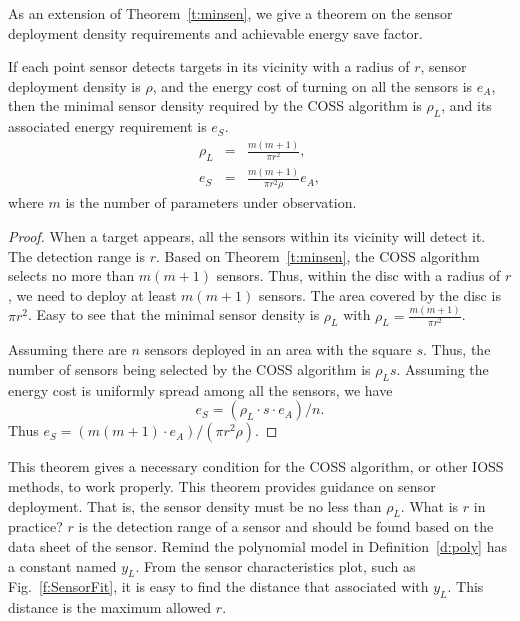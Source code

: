 As an extension of Theorem~\ref{t:minsen}, we give a theorem on the sensor deployment density requirements and achievable energy save factor.
\begin{thm} %
If each point sensor detects targets in its vicinity with a radius of $r$, sensor deployment density is $\rho$, and the energy cost of turning on all the sensors is $e_A$, then the minimal sensor density required by the COSS algorithm
is $\rho_L$, and its associated energy requirement is $e_S$.
\begin{eqnarray*}
\rho_L &=& \frac{m(m+1)}{\pi r^2}, \\
e_S &=& \frac{m(m+1)}{\pi r^2 \rho} e_A,
\end{eqnarray*}
where $m$ is the number of parameters under observation.
\end{thm}
\begin{proof}
When a target appears, all the sensors within its vicinity will detect it. The detection range is $r$. Based on Theorem~\ref{t:minsen}, the COSS algorithm selects no more than $m(m+1)$ sensors. Thus, within the disc with a radius of $r$, we need to deploy at least $m(m+1)$ sensors. The area covered by the disc is $\pi r^2$.
Easy to see that the minimal sensor density is $\rho_L$ with $\rho_L = \frac{m(m+1)}{\pi r^2}$.

Assuming there are $n$ sensors deployed in an area with the square $s$. Thus, the number of sensors being selected by the COSS algorithm is $\rho_L s$. Assuming the energy cost is uniformly spread among all the sensors, we have
$$e_S=(\rho_L\cdot s \cdot e_A)/n.$$
Thus $ e_S = ( m(m+1)\cdot e_A)/(\pi r^2 \rho).$
\end{proof}
\begin{remark}
This theorem gives a necessary condition for the COSS algorithm, or other IOSS methods, to work properly. This theorem provides guidance on sensor deployment. That is, the sensor density must be no less than $\rho_L$.
  What is $r$ in practice? $r$ is the detection range of a sensor and should be found based on the data sheet of the sensor.
    Remind the polynomial model in Definition~\ref{d:poly} has a constant named $y_L$. From the sensor characteristics plot, such as Fig.~\ref{f:SensorFit}, it is easy to find the distance that associated with $y_L$. This distance is the maximum allowed $r$.

\end{remark}

